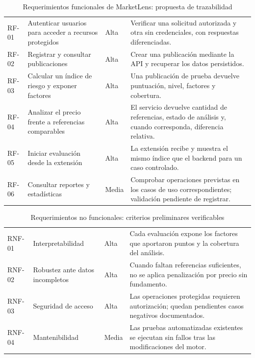 \begin{table}[H]
\centering
\caption{Requerimientos funcionales de MarketLens: propuesta de trazabilidad}
\label{tab:ml-rf}
\scriptsize
\begin{tabularx}{\textwidth}{l L l L}
\toprule
{} &  &  &  \\
\midrule
RF-01 & Autenticar usuarios para acceder a recursos protegidos & Alta & Verificar una solicitud autorizada y otra sin credenciales, con respuestas diferenciadas. \\
RF-02 & Registrar y consultar publicaciones & Alta & Crear una publicación mediante la API y recuperar los datos persistidos. \\
RF-03 & Calcular un índice de riesgo y exponer factores & Alta & Una publicación de prueba devuelve puntuación, nivel, factores y cobertura. \\
RF-04 & Analizar el precio frente a referencias comparables & Alta & El servicio devuelve cantidad de referencias, estado de análisis y, cuando corresponda, diferencia relativa. \\
RF-05 & Iniciar evaluación desde la extensión & Alta & La extensión recibe y muestra el mismo índice que el backend para un caso controlado. \\
RF-06 & Consultar reportes y estadísticas & Media & Comprobar operaciones previstas en los casos de uso correspondientes; validación pendiente de registrar. \\
\bottomrule
\end{tabularx}
\end{table}

\begin{table}[H]
\centering
\caption{Requerimientos no funcionales: criterios preliminares verificables}
\label{tab:ml-rnf}
\scriptsize
\begin{tabularx}{\textwidth}{l L l L}
\toprule
{} &  &  &  \\
\midrule
RNF-01 & Interpretabilidad & Alta & Cada evaluación expone los factores que aportaron puntos y la cobertura del análisis. \\
RNF-02 & Robustez ante datos incompletos & Alta & Cuando faltan referencias suficientes, no se aplica penalización por precio sin fundamento. \\
RNF-03 & Seguridad de acceso & Alta & Las operaciones protegidas requieren autorización; quedan pendientes casos negativos documentados. \\
RNF-04 & Mantenibilidad & Media & Las pruebas automatizadas existentes se ejecutan sin fallos tras las modificaciones del motor. \\
\bottomrule
\end{tabularx}
\end{table}

